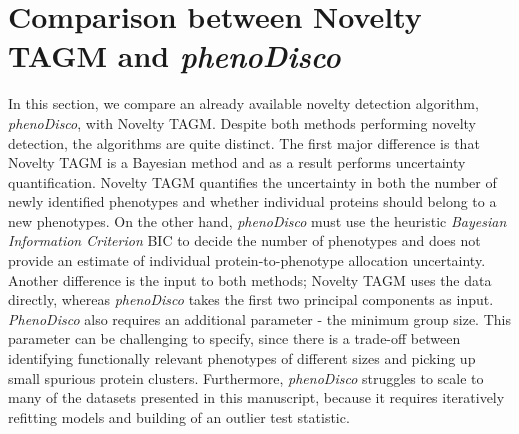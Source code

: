 \documentclass[12pt,english]{article}
\begin{document}
\section{Comparison between Novelty TAGM and \textit{phenoDisco}}
In this section, we compare an already available novelty detection algorithm, \textit{phenoDisco}, with Novelty TAGM. Despite both methods performing novelty detection, the algorithms
are quite distinct. The first major difference is that Novelty TAGM is a Bayesian 
method and as a result performs uncertainty quantification. Novelty TAGM quantifies the uncertainty in both the number of newly identified phenotypes and whether individual proteins should belong to a new phenotypes. On the other hand, \textit{phenoDisco} must use the heuristic \textit{Bayesian Information Criterion} BIC to decide the number of phenotypes and does not provide an estimate of individual protein-to-phenotype allocation uncertainty. Another difference is the input to both methods; Novelty TAGM uses the data directly, whereas \textit{phenoDisco} takes the first two principal components as input. \textit{PhenoDisco} also requires an additional parameter - the minimum group size. This parameter can be challenging to specify, since there is a trade-off between identifying functionally relevant phenotypes of different sizes and picking up small spurious protein clusters. Furthermore, \textit{phenoDisco} struggles to scale to many of the datasets presented in this manuscript, because it requires iteratively refitting models and building of an outlier test statistic. 
\end{document}

